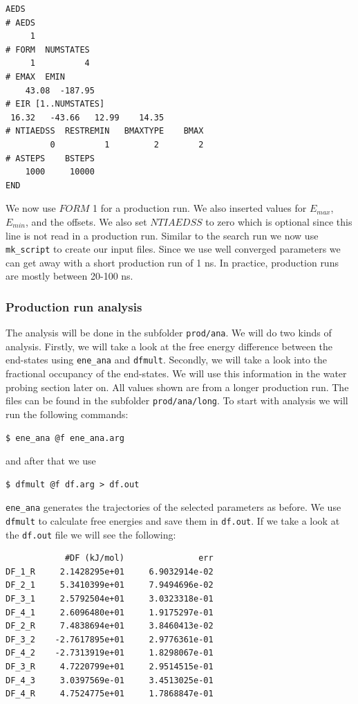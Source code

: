\begin{lstlisting}
AEDS
# AEDS
     1
# FORM  NUMSTATES
     1          4
# EMAX  EMIN
    43.08  -187.95
# EIR [1..NUMSTATES]
 16.32   -43.66   12.99    14.35 
# NTIAEDSS  RESTREMIN   BMAXTYPE    BMAX   
         0          1         2        2      
# ASTEPS    BSTEPS
    1000     10000 
END
\end{lstlisting}

We now use $FORM$ 1 for a production run. We also inserted values for $E_{max}$, $E_{min}$, and the offsets. We also set $NTIAEDSS$ to zero which is optional since this line is not read in a production run. Similar to the search run we now use \texttt{mk\_script} to create our input files.
Since we use well converged parameters we can get away with a short production run of 1 ns. In practice, production runs are mostly between 20-100 ns.

\subsubsection{Production run analysis}
The analysis will be done in the subfolder \texttt{prod/ana}. We will do two kinds of analysis. Firstly, we will take a look at the free energy difference between the end-states using \texttt{ene\_ana} and \texttt{dfmult}. Secondly, we will take a look into the fractional occupancy of the end-states. We will use this information in the water probing section later on. All values shown are from a longer production run. The files can be found in the subfolder \texttt{prod/ana/long}. To start with analysis we will run the following commands:

\begin{lstlisting}
$ ene_ana @f ene_ana.arg
\end{lstlisting}

and after that we use

\begin{lstlisting}
$ dfmult @f df.arg > df.out
\end{lstlisting}

\texttt{ene\_ana} generates the trajectories of the selected parameters as before. We use \texttt{dfmult} to calculate free energies and save them in \texttt{df.out}. If we take a look at the \texttt{df.out} file we will see the following:

\begin{lstlisting}
            #DF (kJ/mol)               err
DF_1_R     2.1428295e+01     6.9032914e-02
DF_2_1     5.3410399e+01     7.9494696e-02
DF_3_1     2.5792504e+01     3.0323318e-01
DF_4_1     2.6096480e+01     1.9175297e-01
DF_2_R     7.4838694e+01     3.8460413e-02
DF_3_2    -2.7617895e+01     2.9776361e-01
DF_4_2    -2.7313919e+01     1.8298067e-01
DF_3_R     4.7220799e+01     2.9514515e-01
DF_4_3     3.0397569e-01     3.4513025e-01
DF_4_R     4.7524775e+01     1.7868847e-01
\end{lstlisting}

